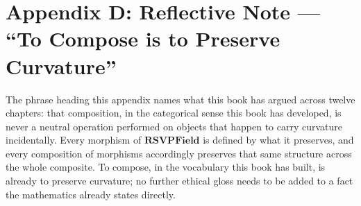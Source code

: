 \chapter*{Appendix D: Reflective Note --- ``To Compose is to Preserve Curvature''}

The phrase heading this appendix names what this book has argued across twelve chapters: that composition, in the categorical sense this book has developed, is never a neutral operation performed on objects that happen to carry curvature incidentally. Every morphism of $\mathbf{RSVPField}$ is defined by what it preserves, and every composition of morphisms accordingly preserves that same structure across the whole composite. To compose, in the vocabulary this book has built, is already to preserve curvature; no further ethical gloss needs to be added to a fact the mathematics already states directly.
